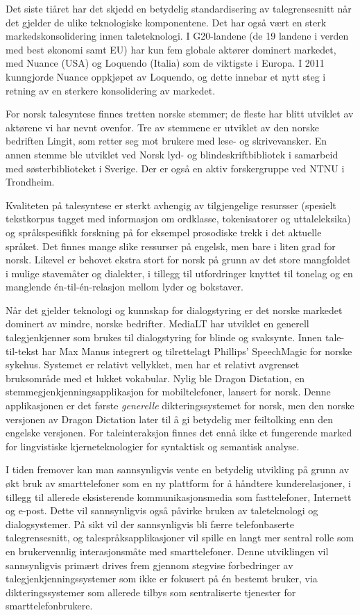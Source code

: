 \begin{multicols}{2}
Det siste tiåret har det skjedd en betydelig standardisering av talegrensesnitt når det gjelder de ulike teknologiske komponentene. Det har  også vært en sterk markedskonsolidering innen taleteknologi. I G20-landene (de 19 landene i verden med best økonomi samt EU) har kun fem globale aktører dominert markedet, med Nuance (USA) og Loquendo (Italia) som de viktigste i Europa. I 2011 kunngjorde Nuance oppkjøpet av Loquendo, og dette innebar et nytt steg i retning av en sterkere konsolidering av markedet. 

For norsk talesyntese finnes tretten norske stemmer; de fleste har blitt utviklet av aktørene vi har nevnt ovenfor. 
Tre av stemmene er utviklet av den norske bedriften Lingit, som retter seg mot brukere med lese- og skrivevansker. 
En annen stemme ble utviklet ved Norsk lyd- og blindeskriftbibliotek i samarbeid med søsterbiblioteket i Sverige. 
Der er også en aktiv forskergruppe ved NTNU i Trondheim.

Kvaliteten på talesyntese er sterkt avhengig av tilgjengelige resursser (spesielt tekstkorpus tagget med informasjon om ordklasse, tokenisatorer og uttaleleksika) og språkspesifikk forskning på for eksempel prosodiske trekk i det aktuelle språket. 
Det finnes mange slike ressurser på engelsk, men bare i liten grad for norsk. Likevel er behovet ekstra stort for norsk på grunn av det store mangfoldet i mulige stavemåter og dialekter, i tillegg til utfordringer knyttet til tonelag og en manglende én-til-én-relasjon mellom lyder og bokstaver.

Når det gjelder teknologi og kunnskap for dialogstyring er det norske markedet dominert av mindre, norske bedrifter. 
MediaLT har utviklet en generell talegjenkjenner som brukes til dialogstyring for blinde og svaksynte. 
Innen tale-til-tekst har Max Manus integrert og tilrettelagt Phillips’ SpeechMagic for norske sykehus. 
Systemet er relativt vellykket, men har et relativt avgrenset bruksområde med et lukket vokabular. 
Nylig ble Dragon Dictation, en stemmegjenkjenningsapplikasjon for mobiltelefoner, lansert for norsk. 
Denne applikasjonen er det første \textit{generelle} dikteringssystemet for norsk, men den norske versjonen av Dragon Dictation later til å gi betydelig mer feiltolking enn den engelske versjonen.
For taleinteraksjon finnes det ennå ikke et fungerende marked for lingvistiske kjerneteknologier for syntaktisk og semantisk analyse.

I tiden fremover kan man sannsynligvis vente en betydelig utvikling på grunn av økt bruk av smarttelefoner som en ny plattform for å håndtere kunderelasjoner, i tillegg til allerede eksisterende kommunikasjonsmedia som fasttelefoner, Internett og e-post.
Dette vil sannsynligvis også påvirke bruken av taleteknologi og dialogsystemer. På sikt vil der sannsynligvis bli færre telefonbaserte talegrensesnitt, og talespråksapplikasjoner vil spille en langt mer sentral rolle som en brukervennlig interasjonsmåte med smarttelefoner.
Denne utviklingen vil sannsynligvis primært drives frem gjennom stegvise forbedringer av talegjenkjenningssystemer som ikke er fokusert på én bestemt bruker, via dikteringssystemer som allerede tilbys som sentraliserte tjenester for smarttelefonbrukere.


\end{multicols}
